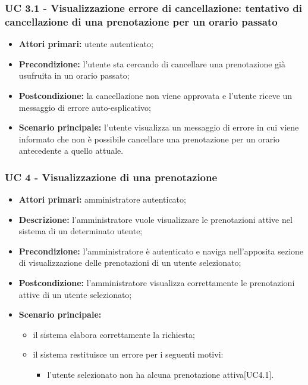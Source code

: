 \subsubsection{UC 3.1 - Visualizzazione errore di cancellazione: tentativo di cancellazione di una prenotazione per un orario passato}
\begin{itemize}
\item \textbf{Attori primari:} utente autenticato;
\item \textbf{Precondizione:} l'utente sta cercando di cancellare una prenotazione già usufruita in un orario passato;
\item \textbf{Postcondizione:} la cancellazione non viene approvata e l'utente riceve un messaggio di errore auto-esplicativo;
\item \textbf{Scenario principale:} l'utente visualizza un messaggio di errore in cui viene informato che non è possibile cancellare una prenotazione per un orario antecedente a quello attuale.
\end{itemize}

\subsubsection{UC 4 - Visualizzazione di una prenotazione}

\begin{itemize}
\item \textbf{Attori primari:} amministratore autenticato;
\item \textbf{Descrizione:} l'amministratore vuole visualizzare le prenotazioni attive nel sistema di un determinato utente;
\item \textbf{Precondizione:} l'amministratore è autenticato e naviga nell’apposita sezione di visualizzazione delle prenotazioni di un utente selezionato;
\item \textbf{Postcondizione:} l'amministratore visualizza correttamente le prenotazioni attive di un utente selezionato;
\item \textbf{Scenario principale:} 
	\begin{itemize}
		\item il sistema elabora correttamente la richiesta;
		\item il sistema restituisce un errore per i seguenti motivi:
		\begin{itemize}
			\item l'utente selezionato non ha alcuna prenotazione attiva[UC4.1].
		\end{itemize}
	\end{itemize}
\end{itemize}

